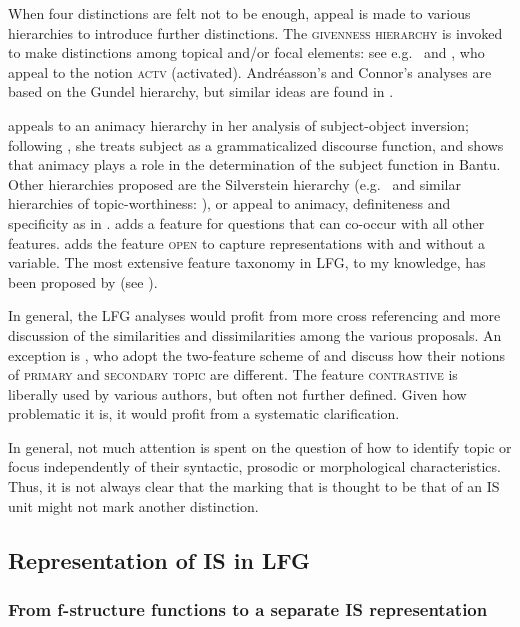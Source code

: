 \documentclass[output=paper,hidelinks]{langscibook}
\begin{document}
When four distinctions are felt not to be enough, appeal is made to various hierarchies to introduce further distinctions. The \textsc{givenness hierarchy} is invoked to make distinctions among topical and/or focal elements: see e.g.\ \citet{Connor2006} and \citet{A08,A09,A13}, who appeal to the notion \textsc{{\pm}actv} (activated). Andr\'easson's and Connor's analyses are based on the Gundel hierarchy, but similar ideas are found in \citet{Lambrecht}. 

\citet{Morimoto2000} appeals to an animacy hierarchy in her analysis of subject-object inversion; following \citet{bresnan2001lexical}, she treats subject as a grammaticalized discourse function, and shows that animacy plays a role in the determination of the subject function in Bantu. Other hierarchies proposed are the Silverstein hierarchy (e.g.\ \citealt{Simpson2012} and similar hierarchies of topic-worthiness: \citealt{DN}), or appeal to animacy, definiteness and specificity as in \citet{Mayer06}. \citet{Mycock2013} adds a feature for questions that can co-occur with all other features. \citet{Connor2006} adds the feature \textsc{{\pm}open} to capture representations with and without a variable. The most extensive feature taxonomy in LFG, to my knowledge, has been proposed by \citet{CookPayne} (see ).

In general, the LFG analyses would profit from more cross referencing and more discussion of the similarities and dissimilarities among the various proposals. An exception is \citet{DN}, who adopt the two-feature scheme of \citet{BK96} and discuss how their notions of \textsc{primary} and \textsc{secondary topic} are different. The feature \textsc{contrastive} is liberally used by various authors, but often not further defined. Given how problematic it is, it would profit from a systematic clarification. 

In general, not much attention is spent on the question of how to identify topic or focus independently of their syntactic, prosodic or morphological characteristics. Thus, it is not always clear that the marking that is thought to be that of an IS unit might not mark another distinction.

\subsection{Representation of IS in LFG} \label{representation}
\subsubsection{From f-structure functions to a separate IS representation}
\end{document}
